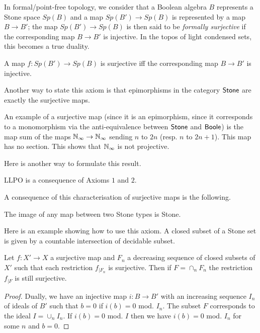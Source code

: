 \medskip

In formal/point-free topology, we consider that a Boolean algebra $B$ represents a Stone space $Sp(B)$ and a map
$Sp(B') \to Sp(B)$ is represented by a map $B\rightarrow B'$; the map $Sp(B')\to Sp(B)$ is then said to be
{\em formally surjective} if the corresponding map $B\to B'$ is injective. In the topos of light condensed sets,
this becomes a true duality.

\begin{axiom}
  A map $f:Sp(B')\to Sp(B)$ is surjective iff the corresponding map $B \to B'$ is injective.
\end{axiom} 

Another way to state this axiom is that epimorphisms in the category $\mathsf{Stone}$ are exactly the surjective maps.

\medskip

An example of a surjective map (since it is an epimorphism, since it corresponds to a monomorphism via the anti-equivalence
between $\mathsf{Stone}$ and $\mathsf{Boole}$) is the map sum of the maps $\mathbb{N}_{\infty}\rightarrow \mathbb{N}_{\infty}$ sending $n$ to $2n$ (resp. $n$ to $2n+1$).
This map has no section. This shows that $\mathbb{N}_{\infty}$ is not projective.

Here is another way to formulate this result.

\begin{proposition}
  LLPO is a consequence of Axioms $1$ and $2$.
\end{proposition}

A consequence of this characterisation of surjective maps is the following.

\begin{proposition}
  The image of any map between two Stone types is Stone.
\end{proposition}

Here is an example showing how to use this axiom. A closed subset of a Stone set is given by a countable
intersection of decidable subset.

\begin{proposition}
  Let $f:X'\rightarrow X$ a surjective map and $F_n$ a decreasing sequence of closed subsets of $X'$ such that
  each restriction $f_{|F_n}$ is surjective. Then if $F = \cap_n F_n$ the restriction $f_{|F}$ is still surjective.
\end{proposition}

\begin{proof}
  Dually, we have an injective map $i:B\rightarrow B'$ with an increasing sequence $I_n$ of ideals of $B'$ such that
  $b = 0$ if $i(b) = 0$ mod. $I_n$. The subset $F$ corresponds to the ideal $I = \cup_n I_n$. If $i(b) = 0$ mod. $I$
  then we have $i(b) = 0$ mod. $I_n$ for some $n$ and $b = 0$. 
\end{proof}





